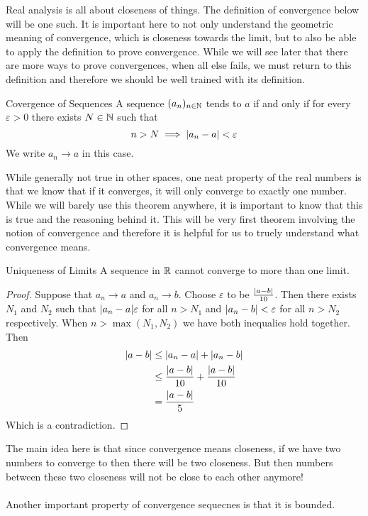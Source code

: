 \documentclass[a4paper]{article}
\begin{document}
Real analysis is all about closeness of things. The definition of convergence below will be one such. It is important here to not only understand the geometric meaning of convergence, which is closeness towards the limit, but to also be able to apply the definition to prove convergence. While we will see later that there are more ways to prove convergences, when all else fails, we must return to this definition and therefore we should be well trained with its definition. 

\begin{defn}{Covergence of Sequences}{} A sequence $(a_n)_{n\in\mathbb{N}}$ tends to $a$ if and only if for every $\varepsilon>0$ there exists $N\in\mathbb{N}$ such that $$n>N\implies \abs{a_n-a}<\varepsilon$$
We write $a_n\to a$ in this case. 
\end{defn}

While generally not true in other spaces, one neat property of the real numbers is that we know that if it converges, it will only converge to exactly one number. While we will barely use this theorem anywhere, it is important to know that this is true and the reasoning behind it. This will be very first theorem involving the notion of convergence and therefore it is helpful for us to truely understand what convergence means. 

\begin{thm}{Uniqueness of Limits}{} A sequence in $\mathbb{R}$ cannot converge to more than one limit. \tcbline
\begin{proof} Suppose that $a_n\to a$ and $a_n\to b$. Choose $\varepsilon$ to be $\frac{\abs{a-b}}{10}$. Then there exists $N_1$ and $N_2$ such that $\abs{a_n-a}\varepsilon$ for all $n>N_1$ and $\abs{a_n-b}<\varepsilon$ for all $n>N_2$ respectively. When $n>\max{(N_1,N_2)}$ we have both inequalies hold together. Then 
\begin{align*}
\abs{a-b}&\leq\abs{a_n-a}+\abs{a_n-b}\\
&\leq \frac{\abs{a-b}}{10}+\frac{\abs{a-b}}{10}\\
&=\frac{\abs{a-b}}{5}
\end{align*}
Which is a contradiction. 
\end{proof}
\end{thm}

The main idea here is that since convergence means closeness, if we have two numbers to converge to then there will be two closeness. But then numbers between these two closeness will not be close to each other anymore! \\~\\
Another important property of convergence sequecnes is that it is bounded. 
\end{document}
